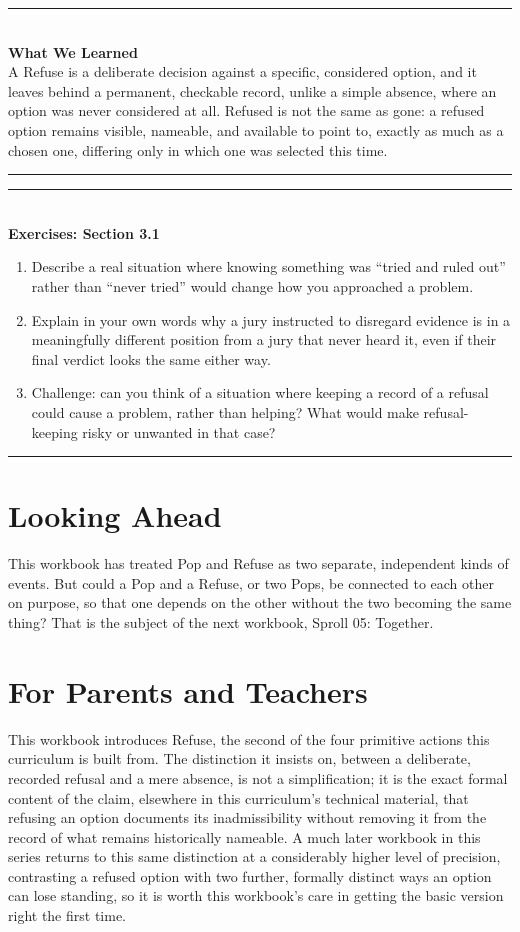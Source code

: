 \documentclass[11pt]{book}
\newenvironment{exercisebox}[1]{%
\vspace{0.8em}\noindent\rule{\linewidth}{0.6pt}\\[0.2em]\textbf{Exercises: #1}\\[0.3em]%
\begin{enumerate}[label=\arabic*., itemsep=0.4em]}%
{\end{enumerate}\noindent\rule{\linewidth}{0.6pt}\vspace{0.6em}}
\newenvironment{summarybox}{%
\vspace{0.6em}\noindent\rule{\linewidth}{0.6pt}\\[0.2em]\textbf{What We Learned}\\[0.3em]}%
{\\[0.2em]\noindent\rule{\linewidth}{0.6pt}\vspace{0.6em}}
\begin{document}
\begin{summarybox}
A Refuse is a deliberate decision against a specific, considered option, and it leaves behind a permanent, checkable record, unlike a simple absence, where an option was never considered at all. Refused is not the same as gone: a refused option remains visible, nameable, and available to point to, exactly as much as a chosen one, differing only in which one was selected this time.
\end{summarybox}

\begin{exercisebox}{Section 3.1}
\item Describe a real situation where knowing something was ``tried and ruled out'' rather than ``never tried'' would change how you approached a problem.
\item Explain in your own words why a jury instructed to disregard evidence is in a meaningfully different position from a jury that never heard it, even if their final verdict looks the same either way.
\item Challenge: can you think of a situation where keeping a record of a refusal could cause a problem, rather than helping? What would make refusal-keeping risky or unwanted in that case?
\end{exercisebox}

\chapter*{Looking Ahead}

This workbook has treated Pop and Refuse as two separate, independent kinds of events. But could a Pop and a Refuse, or two Pops, be connected to each other on purpose, so that one depends on the other without the two becoming the same thing? That is the subject of the next workbook, Sproll 05: Together.

\chapter*{For Parents and Teachers}

This workbook introduces Refuse, the second of the four primitive actions this curriculum is built from. The distinction it insists on, between a deliberate, recorded refusal and a mere absence, is not a simplification; it is the exact formal content of the claim, elsewhere in this curriculum's technical material, that refusing an option documents its inadmissibility without removing it from the record of what remains historically nameable. A much later workbook in this series returns to this same distinction at a considerably higher level of precision, contrasting a refused option with two further, formally distinct ways an option can lose standing, so it is worth this workbook's care in getting the basic version right the first time.
\end{document}

